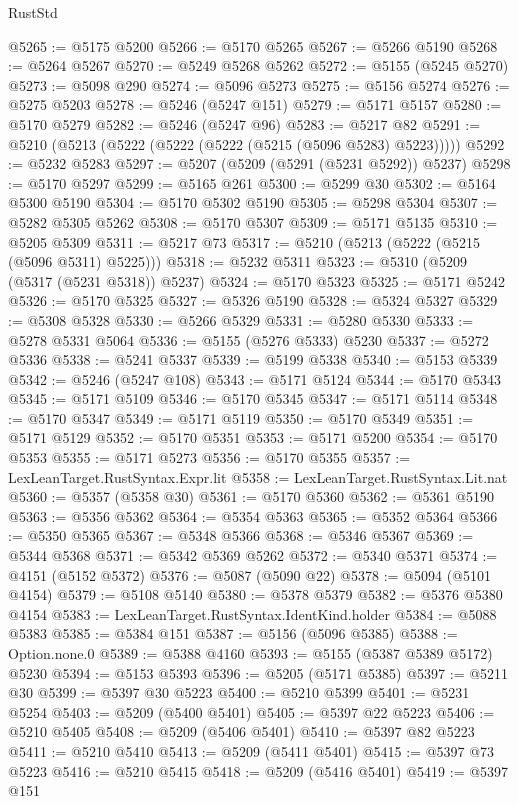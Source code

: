 \begin{lexlean}{RustStd}
\begin{coremodule}
@5265 := @5175 @5200
@5266 := @5170 @5265
@5267 := @5266 @5190
@5268 := @5264 @5267
@5270 := @5249 @5268 @5262
@5272 := @5155 (@5245 @5270)
@5273 := @5098 @290
@5274 := @5096 @5273
@5275 := @5156 @5274
@5276 := @5275 @5203
@5278 := @5246 (@5247 @151)
@5279 := @5171 @5157
@5280 := @5170 @5279
@5282 := @5246 (@5247 @96)
@5283 := @5217 @82
@5291 := @5210 (@5213 (@5222 (@5222 (@5222 (@5215 (@5096 @5283) @5223)))))
@5292 := @5232 @5283
@5297 := @5207 (@5209 (@5291 (@5231 @5292)) @5237)
@5298 := @5170 @5297
@5299 := @5165 @261
@5300 := @5299 @30
@5302 := @5164 @5300 @5190
@5304 := @5170 @5302 @5190
@5305 := @5298 @5304
@5307 := @5282 @5305 @5262
@5308 := @5170 @5307
@5309 := @5171 @5135
@5310 := @5205 @5309
@5311 := @5217 @73
@5317 := @5210 (@5213 (@5222 (@5215 (@5096 @5311) @5225)))
@5318 := @5232 @5311
@5323 := @5310 (@5209 (@5317 (@5231 @5318)) @5237)
@5324 := @5170 @5323
@5325 := @5171 @5242
@5326 := @5170 @5325
@5327 := @5326 @5190
@5328 := @5324 @5327
@5329 := @5308 @5328
@5330 := @5266 @5329
@5331 := @5280 @5330
@5333 := @5278 @5331 @5064
@5336 := @5155 (@5276 @5333) @5230
@5337 := @5272 @5336
@5338 := @5241 @5337
@5339 := @5199 @5338
@5340 := @5153 @5339
@5342 := @5246 (@5247 @108)
@5343 := @5171 @5124
@5344 := @5170 @5343
@5345 := @5171 @5109
@5346 := @5170 @5345
@5347 := @5171 @5114
@5348 := @5170 @5347
@5349 := @5171 @5119
@5350 := @5170 @5349
@5351 := @5171 @5129
@5352 := @5170 @5351
@5353 := @5171 @5200
@5354 := @5170 @5353
@5355 := @5171 @5273
@5356 := @5170 @5355
@5357 := LexLeanTarget.RustSyntax.Expr.lit
@5358 := LexLeanTarget.RustSyntax.Lit.nat
@5360 := @5357 (@5358 @30)
@5361 := @5170 @5360
@5362 := @5361 @5190
@5363 := @5356 @5362
@5364 := @5354 @5363
@5365 := @5352 @5364
@5366 := @5350 @5365
@5367 := @5348 @5366
@5368 := @5346 @5367
@5369 := @5344 @5368
@5371 := @5342 @5369 @5262
@5372 := @5340 @5371
@5374 := @4151 (@5152 @5372)
@5376 := @5087 (@5090 @22)
@5378 := @5094 (@5101 @4154)
@5379 := @5108 @5140
@5380 := @5378 @5379
@5382 := @5376 @5380 @4154
@5383 := LexLeanTarget.RustSyntax.IdentKind.holder
@5384 := @5088 @5383
@5385 := @5384 @151
@5387 := @5156 (@5096 @5385)
@5388 := Option.none.{0}
@5389 := @5388 @4160
@5393 := @5155 (@5387 @5389 @5172) @5230
@5394 := @5153 @5393
@5396 := @5205 (@5171 @5385)
@5397 := @5211 @30
@5399 := @5397 @30 @5223
@5400 := @5210 @5399
@5401 := @5231 @5254
@5403 := @5209 (@5400 @5401)
@5405 := @5397 @22 @5223
@5406 := @5210 @5405
@5408 := @5209 (@5406 @5401)
@5410 := @5397 @82 @5223
@5411 := @5210 @5410
@5413 := @5209 (@5411 @5401)
@5415 := @5397 @73 @5223
@5416 := @5210 @5415
@5418 := @5209 (@5416 @5401)
@5419 := @5397 @151

\end{coremodule}
\end{lexlean}
